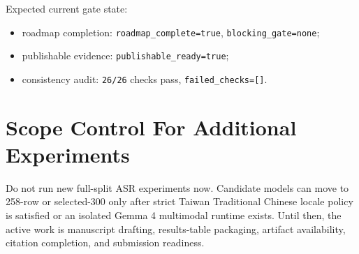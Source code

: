 \documentclass[
]{article}
\providecommand{\tightlist}{%
  \setlength{\itemsep}{0pt}\setlength{\parskip}{0pt}}
\begin{document}
Expected current gate state:

\begin{itemize}
\tightlist
\item
  roadmap completion: \texttt{roadmap\_complete=true},
  \texttt{blocking\_gate=none};
\item
  publishable evidence: \texttt{publishable\_ready=true};
\item
  consistency audit: \texttt{26/26} checks pass,
  \texttt{failed\_checks={[}{]}}.
\end{itemize}

\hypertarget{scope-control-for-additional-experiments}{%
\section{Scope Control For Additional
Experiments}\label{scope-control-for-additional-experiments}}

Do not run new full-split ASR experiments now. Candidate models can move
to 258-row or selected-300 only after strict Taiwan Traditional Chinese
locale policy is satisfied or an isolated Gemma 4 multimodal runtime
exists. Until then, the active work is manuscript drafting,
results-table packaging, artifact availability, citation completion, and
submission readiness.
\end{document}
